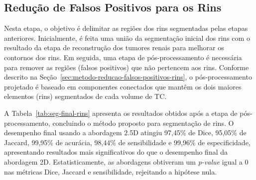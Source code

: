 

\subsection{Redução de Falsos Positivos para os Rins}
\label{sec:resultados-reducao-falsos-positivos-rins}

Nesta etapa, o objetivo é delimitar as regiões dos rins segmentadas pelas etapas anteriores. Inicialmente, é feita uma união da segmentação inicial dos rins com o resultado da etapa de reconstrução dos tumores renais para melhorar os contornos dos rins. Em seguida, uma etapa de pós-processamento é necessária para remover as regiões (falsos positivos) que não pertencem aos rins. Conforme descrito na Seção~\ref{sec:metodo-reducao-falsos-positivos-rins}, o pós-processamento projetado é baseado em componentes conectados que mantêm os dois maiores elementos (rins) segmentados de cada volume de TC.

A Tabela~\ref{tab:seg-final-rins} apresenta os resultados obtidos após a etapa de pós-processamento, concluindo o método proposto para segmentação de rins. O desempenho final usando a abordagem 2.5D atingiu 97,45\% de Dice, 95,05\% de Jaccard, 99,95\% de acurácia, 98,44\% de sensibilidade e 99,96\% de especificidade, apresentando resultados mais significativos do que o desempenho final da abordagem 2D. Estatisticamente, as abordagens obtiveram um \textit{p-value} igual a 0 nas métricas Dice, Jaccard e sensibilidade, rejeitando a hipótese nula.

